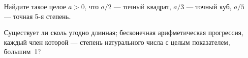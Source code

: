 \documentclass[a4paper, 12pt]{article}
\begin{document}

Найдите такое целое $a>0$, что $a/2$ --- точный квадрат, $a/3$ --- точный куб, $a/5$ --- точная 5-я степень.


Существует ли
сколь угодно длинная;
бесконечная арифметическая прогрессия, каждый член которой --- степень
натурального числа с целым показателем, большим~1?



\end{document}
